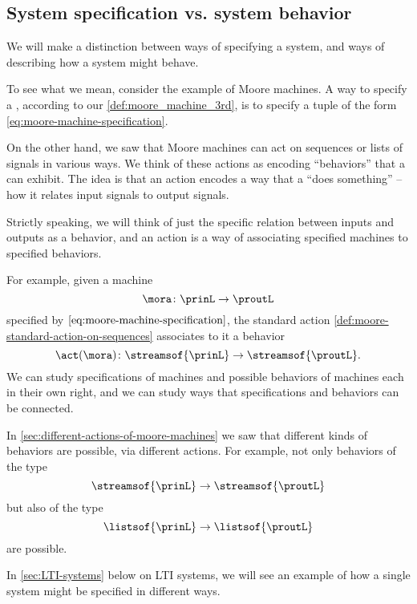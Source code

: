 
\subsection{System specification vs. system behavior}

We will make a distinction between ways of specifying a system, and ways of describing how a system might behave.

To see what we mean, consider the example of Moore machines.
A way to specify a , according to our \cref{def:moore_machine_3rd}, is to specify a tuple of the form \cref{eq:moore-machine-specification}.

On the other hand, we saw that Moore machines can act on sequences or lists of signals in various ways.
We think of these actions as encoding ``behaviors'' that a  can exhibit.
The idea is that an action encodes a way that a  ``does something'' -- how it relates input signals to output signals.

Strictly speaking, we will think of just the specific relation between inputs and outputs as a behavior, and an action is a way of associating specified machines to specified behaviors.


For example, given a machine
\begin{equation}
    \mora \colon \prinL \to \proutL
\end{equation}
specified by $\cref{eq:moore-machine-specification}$, the standard action \cref{def:moore-standard-action-on-sequences} associates to it a behavior
\begin{equation}
    \act(\mora) \colon \streamsof{\prinL} \to \streamsof{\proutL}.
\end{equation}
We can study specifications of machines and possible behaviors of machines each in their own right, and we can study ways that specifications and behaviors can be connected.

In \cref{sec:different-actions-of-moore-machines} we saw that different kinds of behaviors are possible, via different actions.
For example, not only behaviors of the type
\begin{equation}
    \streamsof{\prinL}  \to \streamsof{\proutL}
\end{equation}
but also of the type
\begin{equation}
    \listsof{\prinL} \to \listsof{\proutL}
\end{equation}
are possible.

In \cref{sec:LTI-systems} below on LTI systems, we will see an example of how a single system might be specified in different ways.

